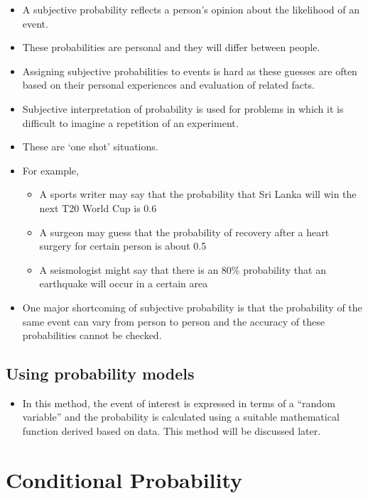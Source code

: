 \documentclass[]{book}
\providecommand{\tightlist}{%
  \setlength{\itemsep}{0pt}\setlength{\parskip}{0pt}}
\begin{document}
\begin{itemize}
\tightlist
\item
  A subjective probability reflects a person's opinion about the likelihood of an event.
\item
  These probabilities are personal and they will differ between people.
\item
  Assigning subjective probabilities to events is hard as these guesses are often based on their personal experiences and evaluation of related facts.
\item
  Subjective interpretation of probability is used for problems in which it is difficult to imagine a repetition of an experiment.
\item
  These are `one shot' situations.
\item
  For example,

  \begin{itemize}
  \tightlist
  \item
    A sports writer may say that the probability that Sri Lanka will win the next T20 World Cup is 0.6
  \item
    A surgeon may guess that the probability of recovery after a heart surgery for certain person is about 0.5
  \item
    A seismologist might say that there is an 80\% probability that an earthquake will occur in a certain area
  \end{itemize}
\item
  One major shortcoming of subjective probability is that the probability of the same event can vary from person to person and the accuracy of these probabilities cannot be checked.
\end{itemize}

\hypertarget{using-probability-models}{%
\subsection{Using probability models}\label{using-probability-models}}

\begin{itemize}
\tightlist
\item
  In this method, the event of interest is expressed in terms of a ``random variable'' and the probability is calculated using a suitable mathematical function derived based on data. This method will be discussed later.
\end{itemize}

\hypertarget{conditional-probability}{%
\section{Conditional Probability}\label{conditional-probability}}
\end{document}

